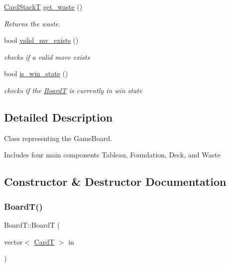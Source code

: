 \begin{DoxyCompactItemize}
\mbox{\hyperlink{_card_stack_8h_a29a6854caf5fec306ee8fc0c6b453837}{Card\+StackT}} \mbox{\hyperlink{class_board_t_a1e3a7edd2e993d22a453da1487177585}{get\+\_\+waste}} ()
\begin{DoxyCompactList}\small\item\em Returns the waste. \end{DoxyCompactList}\item 
bool \mbox{\hyperlink{class_board_t_a9420e96ccd6692d0e63054277c5ef672}{valid\+\_\+mv\+\_\+exists}} ()
\begin{DoxyCompactList}\small\item\em checks if a valid move exists \end{DoxyCompactList}\item 
bool \mbox{\hyperlink{class_board_t_a163bed593a3f0ba24dd5401b595b75cd}{is\+\_\+win\+\_\+state}} ()
\begin{DoxyCompactList}\small\item\em checks if the \mbox{\hyperlink{class_board_t}{BoardT}} is currently in win state \end{DoxyCompactList}\end{DoxyCompactItemize}


\subsection{Detailed Description}
Class representing the Game\+Board. 

Includes four main components Tableau, Foundation, Deck, and Waste 

\subsection{Constructor \& Destructor Documentation}
\mbox{\label{class_board_t_a169b9354c66aa248225b6f8f4fcd6c31}} 
\subsubsection{\texorpdfstring{BoardT()}{BoardT()}}
{\footnotesize\ttfamily Board\+T\+::\+BoardT (\begin{DoxyParamCaption}\item[{vector$<$ \mbox{\hyperlink{struct_card_t}{CardT}} $>$}]{in }\end{DoxyParamCaption})}




